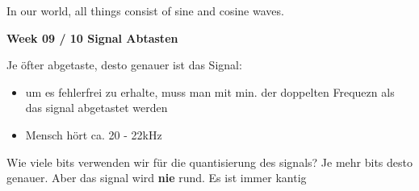 \documentclass[11pt,twoside,twocolumn,landscape]{article}
\begin{document}
In our world, all things consist of sine and cosine waves.

\textbf{Week 09 / 10 Signal Abtasten}

Je öfter abgetaste, desto genauer ist das Signal:
\begin{itemize}
\item um es fehlerfrei zu erhalte, muss man mit min. der doppelten Frequezn als das signal abgetastet werden
\item Mensch hört ca. 20 - 22kHz
\end{itemize}

Wie viele bits verwenden wir für die quantisierung des signals?
Je mehr bits desto genauer. Aber das signal wird \textbf{nie} rund.
Es ist immer kantig
\end{document}

